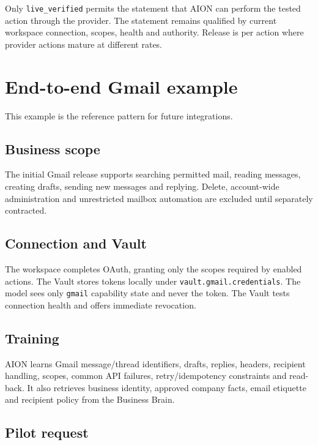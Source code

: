 \documentclass[11pt,a4paper]{article}
\newcommand{\code}[1]{\texttt{#1}}
\begin{document}
\begin{releasebox}
Only \code{live\_verified} permits the statement that AION can perform the
tested action through the provider. The statement remains qualified by current
workspace connection, scopes, health and authority. Release is per action where
provider actions mature at different rates.
\end{releasebox}

\section{End-to-end Gmail example}

This example is the reference pattern for future integrations.

\subsection{Business scope}

The initial Gmail release supports searching permitted mail, reading messages,
creating drafts, sending new messages and replying. Delete, account-wide
administration and unrestricted mailbox automation are excluded until separately
contracted.

\subsection{Connection and Vault}

The workspace completes OAuth, granting only the scopes required by enabled
actions. The Vault stores tokens locally under \code{vault.gmail.credentials}.
The model sees only \code{gmail} capability state and never the token. The Vault
tests connection health and offers immediate revocation.

\subsection{Training}

AION learns Gmail message/thread identifiers, drafts, replies, headers, recipient
handling, scopes, common API failures, retry/idempotency constraints and read-back.
It also retrieves business identity, approved company facts, email etiquette and
recipient policy from the Business Brain.

\subsection{Pilot request}
\end{document}
